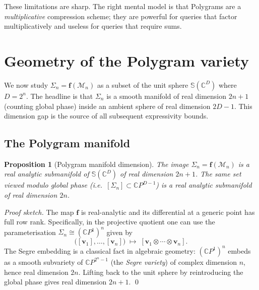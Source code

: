 \documentclass[11pt,letterpaper]{article}
\newtheorem{proposition}[theorem]{Proposition}
\theoremstyle{definition}
\newcommand{\C}{\mathbb{C}}
\newcommand{\Sphere}{\mathbb{S}}
\newcommand{\Mset}{\mathcal{M}}
\begin{document}
These limitations are sharp. The right mental model is that Polygrams are a
\emph{multiplicative} compression scheme; they are powerful for queries that
factor multiplicatively and useless for queries that require sums.

\section{Geometry of the Polygram variety}
\label{sec:geometry}

We now study $\Sigma_{n} = \bm{f}(\Mset_{n})$ as a subset of the unit sphere
$\Sphere(\C^{D})$ where $D = 2^{n}$. The headline is that $\Sigma_{n}$ is a
smooth manifold of real dimension $2n + 1$ (counting global phase) inside an
ambient sphere of real dimension $2D - 1$. This dimension gap is the source of
all subsequent expressivity bounds.

\subsection{The Polygram manifold}

\begin{proposition}[Polygram manifold dimension]
\label{prop:dim}
The image $\Sigma_{n} = \bm{f}(\Mset_{n})$ is a real analytic submanifold of
$\Sphere(\C^{D})$ of real dimension $2n + 1$. The same set viewed modulo
global phase (i.e.\ $[\Sigma_{n}] \subset \C P^{D-1}$) is a real analytic
submanifold of real dimension $2n$.
\end{proposition}

\begin{proof}[Proof sketch]
The map $\bm{f}$ is real-analytic and its differential at a generic point has
full row rank. Specifically, in the projective quotient one can use the
parameterisation $\Sigma_{n} \cong (\C P^{1})^{n}$ given by
\[
\big([\bm{v}_{1}], \dots, [\bm{v}_{n}]\big) \;\longmapsto\;
[\bm{v}_{1} \otimes \cdots \otimes \bm{v}_{n}].
\]
The Segre embedding is a classical fact in algebraic geometry: $(\C P^{1})^{n}$
embeds as a smooth subvariety of $\C P^{2^{n} - 1}$ (the \emph{Segre variety})
of complex dimension $n$, hence real dimension $2n$. Lifting back to the unit
sphere by reintroducing the global phase gives real dimension $2n + 1$.
\qed
\end{proof}
\end{document}
